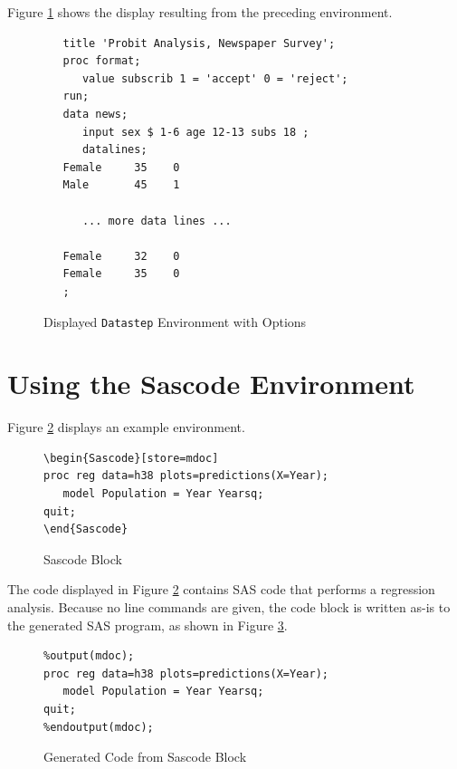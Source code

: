 \documentclass[article,oneside]{memoir}
\begin{document}
  Figure \ref{fig:sd3} shows the display resulting from the preceding
 environment.
\begin{figure}[H]
\begin{snugshade}
\begin{verbatim}
   title 'Probit Analysis, Newspaper Survey';
   proc format;
      value subscrib 1 = 'accept' 0 = 'reject';
   run;
   data news;
      input sex $ 1-6 age 12-13 subs 18 ;
      datalines;
   Female     35    0
   Male       45    1

      ... more data lines ...

   Female     32    0
   Female     35    0
   ;
\end{verbatim}
\end{snugshade}
\caption{Displayed \texttt{Datastep} Environment with Options}\label{fig:sd3}
\end{figure}


\section{Using the Sascode Environment}\label{scex}
Figure \ref{sb} displays an example  environment.

\begin{figure}[H]
\begin{snugshade}
\begin{verbatim}
\begin{Sascode}[store=mdoc]
proc reg data=h38 plots=predictions(X=Year);
   model Population = Year Yearsq;
quit;
\end{Sascode}
\end{verbatim}
\end{snugshade}
\caption{Sascode Block}\label{sb}
\end{figure}
  The code displayed in Figure \ref{sb} contains SAS code that
performs a regression analysis. Because no line commands are given,
the code block is written as-is to the generated SAS program, as shown
in Figure \ref{figsb}.
\begin{figure}[H]
\begin{snugshade}
\begin{verbatim}
%output(mdoc);
proc reg data=h38 plots=predictions(X=Year);
   model Population = Year Yearsq;
quit;
%endoutput(mdoc);
\end{verbatim}
\end{snugshade}
\caption{Generated Code from Sascode Block }\label{figsb}
\end{figure}
\end{document}

